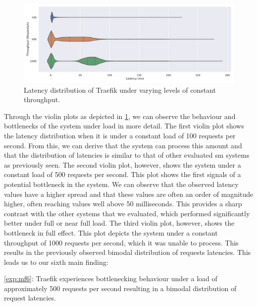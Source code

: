 \begin{figure}[!t]
    \centering
    
    \includegraphics[width=1\linewidth]{5_experimental_evaluation/figures/exp-02-bottleneck-traefik.pdf}

    \caption[Latency distribution of Traefik under varying levels of constant throughput]{Latency distribution of Traefik under varying levels of constant throughput.}
    
    \label{fig:exp:02:traefik-bottleneck}
\end{figure}

Through the violin plots as depicted in \cref{fig:exp:02:traefik-bottleneck}, we can observe the behaviour and bottlenecks of the system under load in more detail. The first violin plot shows the latency distribution when it is under a constant load of 100 requests per second. From this, we can derive that the system can process this amount and that the distribution of latencies is similar to that of other evaluated \gls{sm} systems as previously seen. The second violin plot, however, shows the system under a constant load of 500 requests per second. This plot shows the first signals of a potential bottleneck in the system. We can observe that the observed latency values have a higher spread and that these values are often an order of magnitude higher, often reaching values well above 50 milliseconds. This provides a sharp contrast with the other systems that we evaluated, which performed significantly better under full or near full load. The third violin plot, however, shows the bottleneck in full effect. This plot depicts the system under a constant throughput of 1000 requests per second, which it was unable to process. This results in the previously observed bimodal distribution of requests latencies. This leads us to our sixth main finding:


\begin{shaded*}
    \noindent
    \ref{exp:mf6}: 
    Traefik experiences bottlenecking behaviour under a load of approximately 500 requests per second resulting in a bimodal distribution of request latencies.
\end{shaded*}


